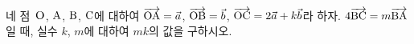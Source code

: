네 점~$\mathrm{O}$, $\mathrm{A}$, $\mathrm{B}$, $\mathrm{C}$에 대하여 $\overrightarrow{\mathrm{OA}}=\vec{a}$, $\overrightarrow{\mathrm{OB}}=\vec{b}$, $\overrightarrow{\mathrm{OC}}=2\vec{a}+k\vec{b}$라 하자. $4\overrightarrow{\mathrm{BC}}=m\overrightarrow{\mathrm{BA}}$일 때, 실수 $k$, $m$에 대하여 $mk$의 값을 구하시오. 
